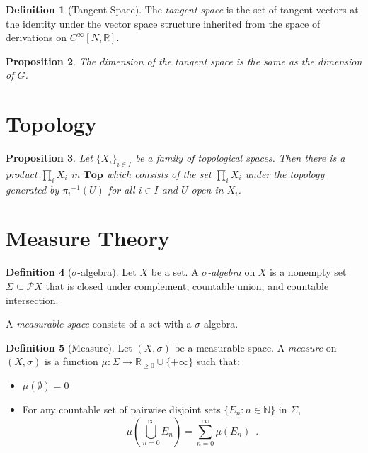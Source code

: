 \documentclass{book}
\newtheorem{prop}{Proposition}[chapter]
\theoremstyle{definition}
\newtheorem{df}[prop]{Definition}
\newcommand{\inv}[1]{\ensuremath{{#1}^{-1}}}
\begin{document}
 
\begin{df}[Tangent Space]
The \emph{tangent space} is the set of tangent vectors at the identity under the vector space structure inherited from the space of derivations on $C^\infty[N, \mathbb{R}]$.
\end{df}

\begin{prop}
The dimension of the tangent space is the same as the dimension of $G$.
\end{prop}


\part{Topology}

\begin{prop}
Let $\{ X_i \}_{i \in I}$ be a family of topological spaces. Then there is a product $\prod_i X_i$ in $\mathbf{Top}$ which consists of the set $\prod_i X_i$ under the topology generated by $\inv{\pi_i}(U)$ for all $i \in I$ and $U$ open in $X_i$.
\end{prop}

\part{Measure Theory}

\begin{df}[$\sigma$-algebra]
Let $X$ be a set. A \emph{$\sigma$-algebra} on $X$ is a nonempty set $\Sigma \subseteq \mathcal{P} X$ that is closed under complement, countable union, and countable intersection.

A \emph{measurable space} consists of a set with a $\sigma$-algebra.
\end{df}

\begin{df}[Measure]
Let $(X, \sigma)$ be a measurable space. A \emph{measure} on $(X, \sigma)$ is a function $\mu : \Sigma \rightarrow \mathbb{R}_{\geq 0} \cup \{ + \infty \}$ such that:
\begin{itemize}
\item $\mu(\emptyset) = 0$
\item For any countable set of pairwise disjoint sets $\{ E_n : n \in \mathbb{N} \}$ in $\Sigma$,
\[ \mu \left( \bigcup_{n=0}^\infty E_n \right) = \sum_{n=0}^\infty \mu(E_n) \enspace . \]
\end{itemize}
\end{df}
\end{document}
